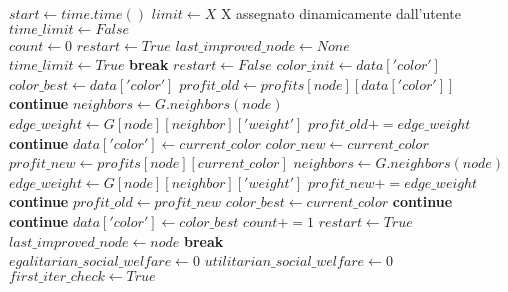 \newpage
\begin{algorithmic}

\State $start\gets time.time()$
\State $limit\gets X$ \Comment X assegnato dinamicamente dall'utente
\State $time\_limit\gets False$ \\

\State $count\gets 0$
\State $restart\gets True$
\State $last\_improved\_node\gets None$\\

		\State $time\_limit\gets True$ 
		\State \textbf{break}
	\EndIf
	\State $restart\gets False$
		\State $color\_init\gets data['color']$
		\State $color\_best\gets data['color']$
		\State $profit\_old\gets profits[node][data['color']]$
			\State \textbf{continue}
		\EndIf
		\State $neighbors\gets G.neighbors(node)$
				\State $edge\_weight\gets G[node][neighbor]['weight']$
				\State $profit\_old += edge\_weight$
			\Else
				\State \textbf{continue}
			\EndIf
		\EndFor
				\State $data['color']\gets current\_color$
				\State $color\_new\gets current\_color$
				\State $profit\_new\gets profits[node][current\_color]$
				\State $neighbors\gets G.neighbors(node)$
						\State $edge\_weight\gets G[node][neighbor]['weight']$
						\State $profit\_new += edge\_weight$
					\Else
						\State \textbf{continue}
					\EndIf
						\State $profit\_old\gets profit\_new$
						\State $color\_best\gets current\_color$
					\Else
						\State \textbf{continue}
					\EndIf
				\EndFor
			\Else
				\State \textbf{continue}
			\EndIf
		\EndFor
		\State $data['color']\gets color\_best$
			\State $count += 1$
			\State $restart\gets True$
			\State $last\_improved\_node\gets node$
			\State \textbf{break}
		\EndIf
	\EndFor
\EndWhile \\

	\State $egalitarian\_social\_welfare\gets 0$
	\State $utilitarian\_social\_welfare\gets 0$
	\State $first\_iter\_check\gets True$ \\


\end{algorithmic}
